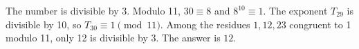 The number is divisible by 3. Modulo 11, $30\equiv8$ and $8^{10}\equiv1$. The exponent $T_{29}$ is divisible by 10, so $T_{30}\equiv1\pmod{11}$. Among the residues $1,12,23$ congruent to 1 modulo 11, only 12 is divisible by 3. The answer is $\boxed{12}$.
